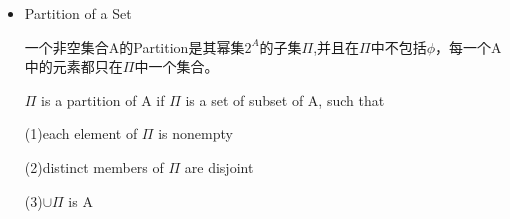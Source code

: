 \documentclass[UTF8]{ctexart}
\begin{document}
\begin{itemize}
    The power set of A，denoted $2^A$, is the collection of all subsets of a set of A. 
    
    eg: $2^{\{c,d\}} =\{\{c,d\},\{c\},\{d\},\phi\}$.

    \item Partition of a Set
    
    一个非空集合A的Partition是其幂集$2^A$的子集$\varPi$,并且在$\varPi$中不包括$\phi$，每一个A中的元素都只在$\varPi$中一个集合。
    
    $\varPi$ is a partition of A if $\varPi$ is a set of subset of A, such that

    (1)each element of $\varPi$ is nonempty

    (2)distinct members of $\varPi$ are disjoint

    (3)$\cup \varPi$ is A

    
\end{itemize}
\end{document}
